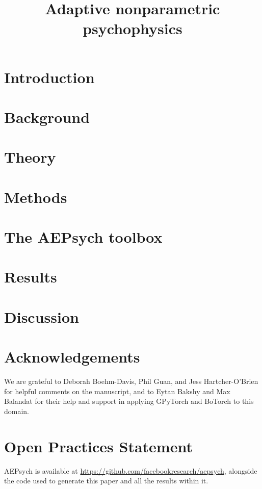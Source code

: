 \documentclass[jou,floatsintext]{apa6}
\title{Adaptive nonparametric psychophysics}
\begin{document}
\maketitle


\section{Introduction}


\section{Background}


\section{Theory}


\section{Methods}


\section{The AEPsych toolbox}


\section{Results}


\section{Discussion}



\section{Acknowledgements}
We are grateful to Deborah Boehm-Davis, Phil Guan, and Jess Hartcher-O'Brien for helpful comments on the manuscript, and to Eytan Bakshy and Max Balandat for their help and support in applying GPyTorch and BoTorch to this domain.

\section{Open Practices Statement}
AEPsych is available at \url{https://github.com/facebookresearch/aepsych}, alongside the code used to generate this paper and all the results within it.

\clearpage
\printbibliography[]
\end{document}
